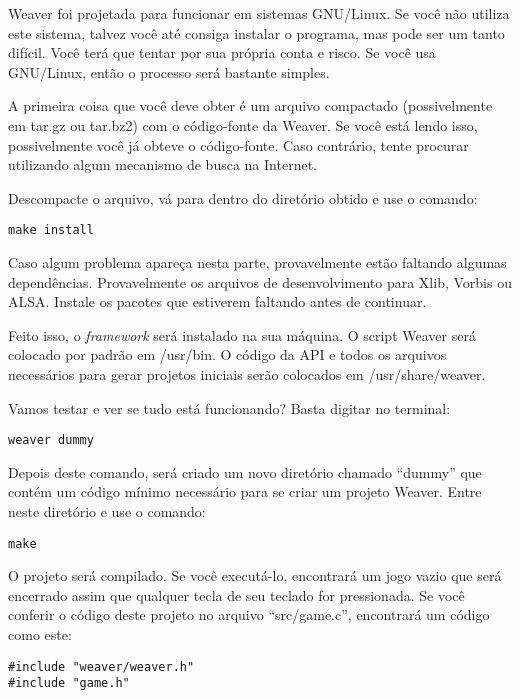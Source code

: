 \documentclass[11pt,a4paper]{book}
\begin{document}
Weaver foi projetada para funcionar em sistemas GNU/Linux. Se você não
utiliza este sistema, talvez você até consiga instalar o programa, mas
pode ser um tanto difícil. Você terá que tentar por sua própria conta
e risco. Se você usa GNU/Linux, então o processo será bastante simples.

A primeira coisa que você deve obter é um arquivo compactado
(possivelmente em tar.gz ou tar.bz2) com o código-fonte da Weaver. Se
você está lendo isso, possivelmente você já obteve o
código-fonte. Caso contrário, tente procurar utilizando algum
mecanismo de busca na Internet.

Descompacte o arquivo, vá para dentro do diretório obtido e use o
comando:

\begin{verbatim}
make install
\end{verbatim}

Caso algum problema apareça nesta parte, provavelmente estão faltando
algumas dependências. Provavelmente os arquivos de desenvolvimento
para Xlib, Vorbis ou ALSA. Instale os pacotes que estiverem faltando
antes de continuar.

Feito isso, o \textit{framework} será instalado na sua máquina. O
script Weaver será colocado por padrão em /usr/bin. O código da API e
todos os arquivos necessários para gerar projetos iniciais serão
colocados em /usr/share/weaver.

Vamos testar e ver se tudo está funcionando? Basta digitar no
terminal:

\begin{verbatim}
weaver dummy
\end{verbatim}

Depois deste comando, será criado um novo diretório chamado ``dummy''
que contém um código mínimo necessário para se criar um projeto
Weaver. Entre neste diretório e use o comando:

\begin{verbatim}
make
\end{verbatim}

O projeto será compilado. Se você executá-lo, encontrará um jogo vazio
que será encerrado assim que qualquer tecla de seu teclado for
pressionada. Se você conferir o código deste projeto no arquivo
``src/game.c'', encontrará um código como este:

\begin{verbatim}
#include "weaver/weaver.h"
#include "game.h"
\end{verbatim}
\end{document}
